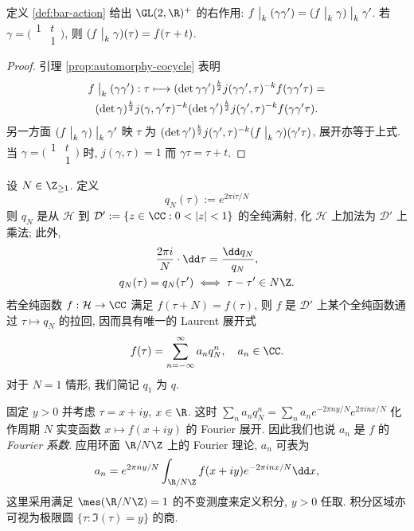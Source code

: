 \begin{lemma}
	定义 \ref{def:bar-action} 给出 $\GL(2,\R)^+$ 的右作用: $f\;\big|_{k} \;(\gamma\gamma') = (f\;\big|_{k} \; \gamma)\;\big|_{k} \; \gamma'$. 若 $\gamma = \bigl(\begin{smallmatrix} 1 & t \\ & 1 \end{smallmatrix}\bigr)$, 则 $(f\;\big|_{k} \; \gamma)(\tau) = f(\tau + t)$.
\end{lemma}
\begin{proof}
	引理 \ref{prop:automorphy-cocycle} 表明
	\begin{multline*}
		f\;\big|_{k} \; (\gamma\gamma'): \tau \longmapsto (\det\gamma\gamma')^{\frac{k}{2}} j(\gamma\gamma', \tau)^{-k} f(\gamma\gamma'\tau) = \\
		(\det\gamma)^{\frac{k}{2}} j(\gamma, \gamma'\tau)^{-k} (\det\gamma')^{\frac{k}{2}} j(\gamma', \tau)^{-k} f(\gamma\gamma'\tau).
	\end{multline*}
	另一方面 $(f\;\big|_{k} \;\gamma) \;\big|_{k} \; \gamma'$ 映 $\tau$ 为 $(\det\gamma')^{\frac{k}{2}} j(\gamma', \tau)^{-k} (f\;\big|_{k} \;\gamma)(\gamma' \tau)$, 展开亦等于上式. 当 $\gamma = \bigl(\begin{smallmatrix} 1 & t \\ & 1 \end{smallmatrix}\bigr)$ 时, $j(\gamma,\tau)=1$ 而 $\gamma\tau = \tau + t$.
\end{proof}

设 $N \in \Z_{\geq 1}$. 定义 
\[ q_N(\tau) := e^{2\pi i\tau/N} \]
则 $q_N$ 是从 $\mathcal{H}$ 到 $\mathcal{D}' := \{ z \in \CC: 0<|z|<1 \}$ 的全纯满射, 化 $\mathcal{H}$ 上加法为 $\mathcal{D}'$ 上乘法; 此外,
\begin{equation*}\begin{gathered}
	\frac{2\pi i}{N} \cdot \dd\tau = \frac{\dd q_N}{q_N}, \\
	q_N(\tau) = q_N(\tau') \iff \tau - \tau' \in N\Z.
\end{gathered}\end{equation*}
若全纯函数 $f: \mathcal{H} \to \CC$ 满足 $f(\tau + N) = f(\tau)$, 则 $f$ 是 $\mathcal{D}'$ 上某个全纯函数通过 $\tau \mapsto q_N$ 的拉回, 因而具有唯一的 Laurent 展开式
\begin{equation}\label{eqn:Laurent-expansion}
	f(\tau) = \sum_{n=-\infty}^\infty a_n q_N^n, \quad a_n \in \CC.
\end{equation}
对于 $N=1$ 情形, 我们简记 $q_1$ 为 $q$.

\begin{remark}\label{rem:Fourier-coeff} 
	固定 $y > 0$ 并考虑 $\tau = x + iy$, $x \in \R$. 这时 $\sum_n a_n q_N^n = \sum_n a_n e^{-2\pi ny/N} e^{2\pi inx/N}$ 化作周期 $N$ 实变函数 $x \mapsto f(x+iy)$ 的 Fourier 展开. 因此我们也说 $a_n$ 是 $f$ 的 \emph{Fourier 系数}. 应用环面 $\R/N\Z$ 上的 Fourier 理论,  $a_n$ 可表为
	\[ a_n = e^{2\pi ny /N} \int_{\R/N\Z} f(x+iy) e^{-2\pi inx/N} \dd x, \]
	这里采用满足 $\mes(\R/N\Z) = 1$ 的不变测度来定义积分, $y > 0$ 任取. 积分区域亦可视为极限圆 $\{\tau: \Im(\tau)=y\}$ 的商.
\end{remark}

